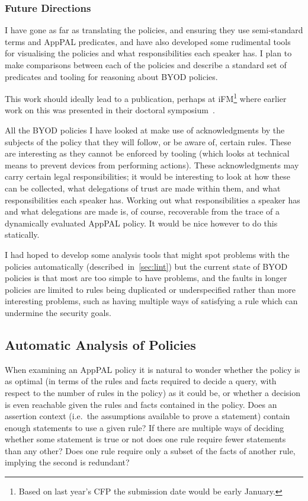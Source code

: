 \documentclass[a4paper]{scrartcl}
\begin{document}
\subsubsection*{Future Directions}

I have gone as far as translating the policies, and ensuring they use
semi-standard terms and AppPAL predicates,  and have also developed some
rudimental tools for visualising the policies and what responsibilities each
speaker has.  I plan to make comparisons between each of the policies and
describe a standard set of predicates and tooling for reasoning about BYOD
policies.

This  work should ideally lead to a publication, perhaps at
iFM\footnote{Based on last year's CFP the submission date would be early January.} where
earlier work on this was presented in their doctoral
symposium~\cite{hallett_specifying_2016}.

All the BYOD policies I have looked at make use of acknowledgments by the
subjects of the policy that they will follow, or be aware of, certain rules.
These are interesting as they cannot be enforced by tooling (which looks at
technical means to prevent devices from performing actions).  These
acknowledgments may carry certain legal responsibilities; it would be
interesting to look at how these can be collected, what delegations of trust
are made within them, and what responsibilities each speaker has.  Working out
what responsibilities a speaker has and what delegations are made is, of
course, recoverable from the trace of a dynamically evaluated AppPAL policy.
It would be nice however to do this statically.

I had hoped to develop some analysis tools that might spot problems with the
policies automatically (described~in~\autoref{sec:lint}) but the current state
of BYOD policies is that most are too simple to have problems, and the faults in
longer policies are limited to rules being duplicated or underspecified
rather than more interesting problems,  such as having multiple ways of
satisfying a rule which can undermine the security goals.

\subsection{Automatic Analysis of Policies}
\label{sec:lint}

When examining an AppPAL policy it is natural to wonder whether the policy is
as optimal (in terms of the rules and facts required to decide a query, with
respect to the number of rules in the policy) as it could be, or whether a
decision is even reachable given the rules and facts contained in the policy.
Does an assertion context (i.e.~the assumptions available to prove a statement) contain enough statements to use a given rule? If
there are multiple ways of deciding whether some statement is true or not does
one rule require fewer statements than any other? Does one rule require only a
subset of the facts of another rule, implying the second is redundant?
\end{document}
